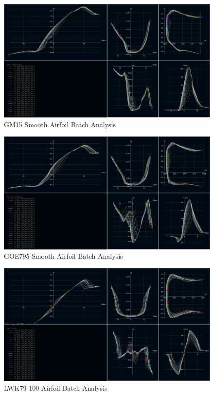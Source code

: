 \documentclass[]{article}
\begin{document}
\begin{figure}[H]
\includegraphics[scale=0.4]{gm15sm_batch}
\caption{GM15 Smooth Airfoil Batch Analysis}
\end{figure}

\begin{figure}[H]
\includegraphics[scale=0.4]{goe795sm_batch}
\caption{GOE795 Smooth Airfoil Batch Analysis}
\end{figure}

\begin{figure}[H]
\includegraphics[scale=0.4]{lwk79-100_batch}
\caption{LWK79-100 Airfoil Batch Analysis}
\end{figure}
\end{document}
